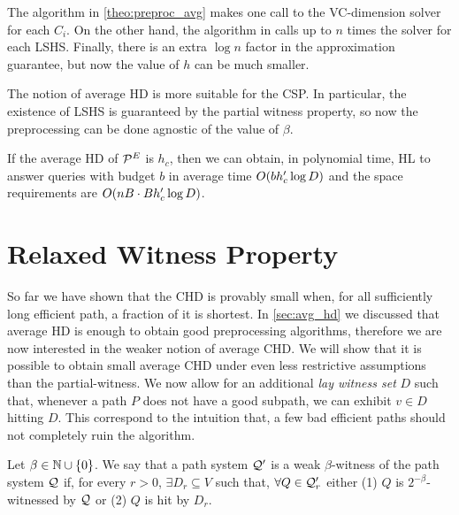 \documentclass[letterpaper,11pt]{article}
\begin{document}
\begin{remark}
The algorithm in \cref{theo:preproc_avg} makes one call to the VC-dimension solver for each $C_i$.
On the other hand, the algorithm in \cite{highway2013} calls up to $n$ times the solver for each LSHS.
Finally, there is an extra $\log n$ factor in the approximation guarantee, but now the value of $h$ can be much smaller.
\end{remark}

The notion of average HD is more suitable for the CSP.
In particular, the existence of LSHS is guaranteed by the partial witness property, so now the preprocessing can be done agnostic of the value of $\beta$.

\begin{theorem}
If the average HD of $\mathcal{P}^E$ is $h_c$, then we can obtain, in polynomial time, HL to answer queries with budget $b$ in average time $O(bh_c'\log D)$ and the space requirements are $O(nB\cdot Bh_c'\log D)$.
\end{theorem}

\section{Relaxed Witness Property}\label{sec:rel_witness}

So far we have shown that the CHD is provably small when, for all sufficiently long efficient path, a fraction of it is shortest.
In \cref{sec:avg_hd} we discussed that average HD is enough to obtain good preprocessing algorithms, therefore we are now interested in the weaker notion of average CHD.
We will show that it is possible to obtain small average CHD under even less restrictive assumptions than the partial-witness.
We now allow for an additional \emph{lay witness set} $D$ such that, whenever a path $P$ does not have a good subpath, we can exhibit $v\in D$ hitting $D$.
This correspond to the intuition that, a few bad efficient paths should not completely ruin the algorithm. 

\begin{definition}
Let $\beta\in\mathbb{N}\cup\{0\}$.
We say that a path system $\mathcal{Q}'$ is a weak $\beta$-witness of the path system $\mathcal{Q}$ if, for every $r>0$, $\exists D_r\subseteq V$ such that, $\forall Q\in \mathcal{Q}'_r$ either (1) $Q$ is $2^{-\beta}$-witnessed by $\mathcal{Q}$ or (2) $Q$ is hit by $D_r$.
\end{definition} 
\end{document}

